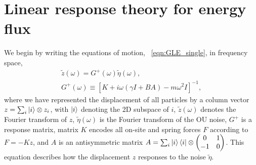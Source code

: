 \documentclass[
 preprint,
 preprintnumbers,
 amsmath,amssymb,
 aps,
 pre,
 longbibliography,
 superscriptaddress,
 10pt, twocolumn
]{revtex4-1}
\begin{document}



\section{Linear response theory for energy flux} \label{sec:linear_response}

We begin by writing the equations of motion, \eqnname~\eqref{eqn:GLE_single}, in frequency space,
\begin{gather} \label{eqn:response}
    \tilde{z}(\omega) = G^+(\omega) \tilde{\eta}(\omega), \\
    G^{+}(\omega) \equiv [K + i\omega(\gamma I + BA) - m\omega^2I]^{-1},
\end{gather}
where we have represented the displacement of all particles by a column vector $z=\sum_i \ket{i}\otimes z_i$, with $\ket{i}$ denoting the 2D subspace of $i$, $\tilde{z}(\omega)$ denotes the Fourier transform of $z$, $\tilde{\eta}(\omega)$ is the Fourier transform of the OU noise, $G^+$ is a response matrix, matrix $K$ encodes all on-site and spring forces $F$ according to $F=-Kz$, and $A$ is an antisymmetric matrix $A=\sum_i \ket{i}\bra{i}\otimes \mqty(0 & 1 \\ -1 & 0)$. This equation describes how the displacement $z$ responses to the noise $\tilde{\eta}$.
\end{document}
